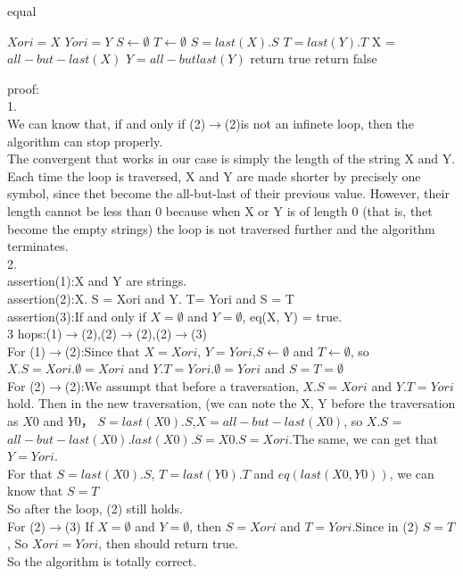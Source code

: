 \documentclass[a4paper, justified]{tufte-handout}
\begin{document}
\begin{problem}
\end{problem}

\begin{solution}
  \begin{algorithm}
    \caption{equal}
    \label{alg:sum}
    \begin{algorithmic}[2]
      \State $Xori = X$
      \State $Yori = Y$
      \State $S \gets \emptyset$
      \State $T \gets \emptyset$
      \State $S = last(X).S $
      \State $T = last(Y). T$
      \State X = $all-but-last(X)$
      \State $Y = all-but last(Y)$
      \EndWhile
      \State return true
      \Else \State return false
      \EndIf
      \EndProcedure
    \end{algorithmic}
  \end{algorithm}
  proof:\\
  1.\\
  We can know that, if and only if (2)$\rightarrow$(2)is not an infinete loop, then the algorithm can stop properly.\\
  The convergent that works in our case is simply the length of the string X and Y. Each time the loop is traversed, X and Y are made shorter by precisely one symbol, since thet become the all-but-last of their previous value. However, their length cannot be less than 0 because when X or Y is of length 0 (that is, thet become the empty strings) the loop is not traversed further and the algorithm terminates.\\
  2.\\
  assertion(1):X and Y are strings.\\
  assertion(2):X. S = Xori and Y. T= Yori and S = T\\
  assertion(3):If and only if $X = \emptyset$ and $Y = \emptyset$, eq(X, Y) = true.\\
  3 hops:(1)$\rightarrow$(2),(2)$\rightarrow$(2),(2)$\rightarrow$(3)\\
  For (1)$\rightarrow$(2):Since that $X = Xori$, $Y = Yori$,$S \gets \emptyset$ and $T \gets \emptyset$, so $X. S = Xori . \emptyset = Xori$ and $Y. T = Yori . \emptyset = Yori$ and $S = T =\emptyset$\\
  For (2)$\rightarrow$(2):We assumpt that before a traversation, $X.S = Xori$ and $Y.T = Yori$ hold. Then in the new traversation, (we can note the X, Y before the traversation as $X0$ and $Y0$， $S = last(X0).S$,$X = all-but-last(X0)$, so $X . S$ = $all-but-last(X0) . last(X0) . S = X0 . S =Xori$.The same, we can get that $Y = Yori$.\\
  For that $S = last(X0).S$, $T = last(Y0).T$ and $eq(last(X0, Y0))$, we can know that $S = T$\\
  So after the loop, (2) still holds.\\
  For (2)$\rightarrow$(3) If $X = \emptyset$ and $Y = \emptyset$, then $S = Xori$ and $T = Yori$.Since in (2) $S = T$, So $Xori = Yori$, then should return true.\\
  So the algorithm is totally correct.


\end{solution}
\end{document}
